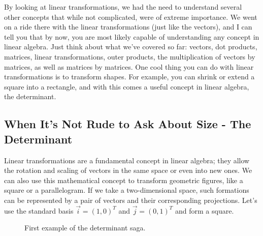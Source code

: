 \documentclass[600paper, 11pt,twoside,openany]{kdp}
\begin{document}
\par 
\vspace{-3pt}
\indent By looking at linear transformations, we had the need to understand several other concepts that while not complicated, were of extreme importance. We went on  a ride there with the linear transformations (just like the vectors), and I can tell you that by now, you are most likely capable of understanding any concept in linear algebra. Just think about what we’ve covered so far: vectors, dot products, matrices, linear transformations, outer products, the multiplication of vectors by matrices, as well as matrices by matrices. One cool thing you can do with linear transformations is to transform shapes. For example, you can shrink or extend a square into a rectangle, and with this comes a useful concept in linear algebra, the determinant.
\newpage
\subsection{When It’s Not Rude to Ask About Size - The Determinant}
\indent Linear transformations are a fundamental concept in linear algebra; they allow the rotation and scaling of vectors in the same space or even into new ones. We can also use this mathematical concept to transform geometric figures, like a square or a parallelogram. If we take a two-dimensional space, such formations can be represented by a pair of vectors and their corresponding projections. Let’s use the standard basis $\overrightarrow{i} =(1,0)^T $ and $\overrightarrow{j} = (0,1) ^T$ and form a square.
\begin{figure}[h!]
\begin{center}
\end{center}
\caption{First example of the determinant saga.}
\end{figure}
\end{document}
